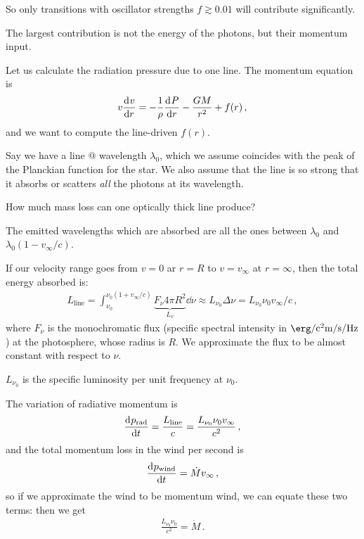 \documentclass[main.tex]{subfiles}
\begin{document}
So only transitions with oscillator strengths \(f \gtrsim 0.01\) will contribute significantly.


The largest contribution is not the energy of the photons, but their momentum input.

Let us calculate the radiation pressure due to one line. The momentum equation is 
%
\begin{align}
  v \dv[]{v}{r} = - \frac{1}{\rho } \dv[]{P}{r} - \frac{GM}{r^2} + f(r)
\,,
\end{align}
%
and we want to compute the line-driven \(f(r)\).

Say we have a line @ wavelength \(\lambda_0 \),  which we assume coincides with the peak of the Planckian function for the star.
We also assume that the line is so strong that it absorbs or scatters \emph{all} the photons at its wavelength.


How much mass loss can one optically thick line produce? 

The emitted wavelengths which are absorbed are all the ones between \(\lambda_0\) and \(\lambda_0 (1 - v_{\infty}/c)\).

If our velocity range goes from \(v=0\) ar \(r = R\) to \(v = v_{\infty}\) at \(r = \infty\), then the total energy absorbed is: 
%
\begin{align}
  L _{\text{line}} = \int _{\nu_0 }^{\nu_0 (1 + v_{\infty}/c)} \underbrace{F_\nu 4 \pi R^2}_{{L_{\nu}}} \dd{\nu } \approx L_{\nu_0 } \Delta \nu = L_{\nu_0 } \nu_0 v_{\infty} /c
\,,
\end{align}
%
where \(F_{\nu }\) is the monochromatic flux (specific spectral intensity in \(\SI{}{\erg\per\square\centi\metre\per\second\per\hertz}\)) at the photosphere, whose radius is \(R\).
We approximate the flux to be almost constant with respect to \(\nu \).

\(L_{\nu_0 }\) is the specific luminosity per unit frequency at \(\nu_0 \).

The variation of radiative momentum is 
%
\begin{align}
  \dv[]{p _{\text{rad}}}{t} = \frac{L _{\text{line}}}{c}
  = \frac{L_{\nu_0 } \nu_0 v_{\infty}}{c^2}
\,,
\end{align}
%
and the total momentum loss in the wind per second is 
%
\begin{align}
  \dv[]{p _{\text{wind}}}{t} = \dot{M} v_{\infty} 
\,,
\end{align}
%
so if we approximate the wind to be momentum wind, we can equate these two terms: then we get 
%
\begin{align}
  \frac{L_{\nu_0 } \nu_0}{c^2} = \dot{M} 
\,.
\end{align}
\end{document}
